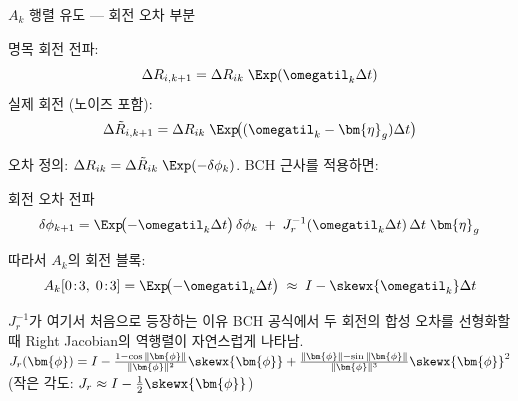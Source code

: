 
\begin{frame}[shrink=10]{$A_k$ 행렬 유도 — 회전 오차 부분}

  명목 회전 전파:
  \[
    \Delta R_{i,k+1} = \Delta R_{ik}\;\Exp(\omegatil_k\Delta t)
  \]
  실제 회전 (노이즈 포함):
  \[
    \Delta \tilde{R}_{i,k+1}
    = \Delta R_{ik}\;\Exp\!\bigl((\omegatil_k - \bm{\eta}_g)\Delta t\bigr)
  \]

  \pause
  오차 정의: $\Delta R_{ik} = \Delta\tilde{R}_{ik}\;\Exp(-\delta\phi_k)$. BCH 근사를 적용하면:

  \begin{block}{회전 오차 전파}
    \[
      \delta\phi_{k+1}
      = \Exp\!\bigl(-\omegatil_k\Delta t\bigr)\,\delta\phi_k
        \;+\; J_r^{-1}(\omegatil_k\Delta t)\,\Delta t\;\bm{\eta}_g
    \]
  \end{block}

  \pause
  따라서 $A_k$의 회전 블록:
  \[
    A_k[0\!:\!3,\;0\!:\!3]
    = \Exp\!\bigl(-\omegatil_k\Delta t\bigr)
    \;\approx\; I - \skewx{\omegatil_k}\Delta t
  \]

  \pause
  \begin{alertblock}{$J_r^{-1}$가 여기서 처음으로 등장하는 이유}
    BCH 공식에서 두 회전의 합성 오차를 선형화할 때 Right Jacobian의 역행렬이 자연스럽게 나타남.
    $J_r(\bm{\phi}) = I - \frac{1-\cos\|\bm{\phi}\|}{\|\bm{\phi}\|^2}\skewx{\bm{\phi}}
    + \frac{\|\bm{\phi}\|-\sin\|\bm{\phi}\|}{\|\bm{\phi}\|^3}\skewx{\bm{\phi}}^2$
    (작은 각도: $J_r \approx I - \frac{1}{2}\skewx{\bm{\phi}}$)
  \end{alertblock}
\end{frame}


